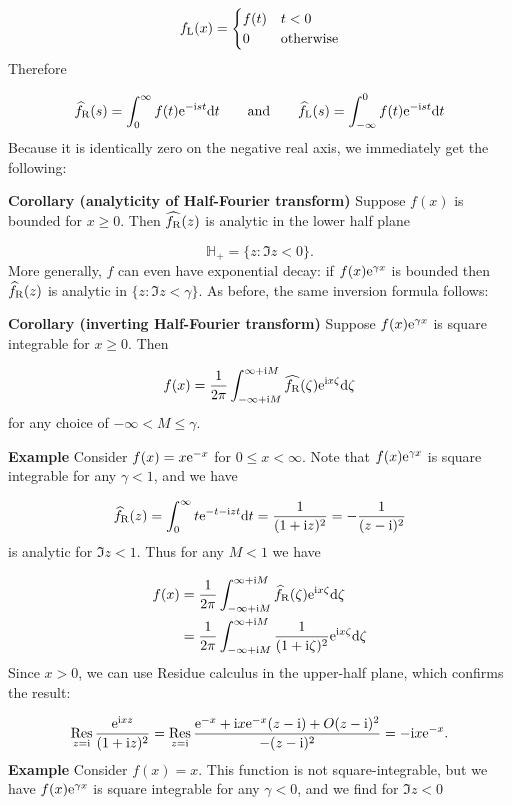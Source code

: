 \documentclass[12pt,landscape]{article}
\def\qqand{\qquad\hbox{and}\qquad}
\def\D{ {\rm d} }
\def\I{ {\rm i} }
\def\E{ {\rm e} }
\def\H{ {\mathbb H} }
\def\fR{ f_{\rm R} }
\def\fL{ f_{\rm L} }
\def\Res_#1{\underset{#1}{\rm Res}\,}
\def\dt{\D t}
\begin{document}
{\[
f_{\rm L}(x) = \begin{cases}f(t) & t < 0 \\ 0 & \hbox{otherwise} \end{cases}
\]
Therefore

\[
\widehat\fR(s) = \int_0^\infty f(t) \E^{-\I s t} \dt \qqand \widehat\fL(s) = \int_{-\infty}^0 f(t) \E^{-\I s t} \dt
\]
Because it is identically zero on the negative real axis, we immediately get the following:

\textbf{Corollary (analyticity of Half-Fourier transform)}  Suppose $f(x)$ is bounded for $x \geq 0$. Then $\widehat{\fR}(z)$ is analytic in the lower half plane

\[
\H_+ = \{ z : \Im z < 0 \}.
\]
More generally, $f$ can even have exponential decay: if $f(x) \E^{\gamma x}$ is bounded then $\widehat\fR(z)$ is analytic in $\{z : \Im z < \gamma \}$.  As before, the same inversion formula follows:

\textbf{Corollary  (inverting Half-Fourier transform)}  Suppose  $f(x) \E^{\gamma x}$ is square integrable for $x \geq 0$. Then

\[
f(x) = {1 \over 2 \pi} \int_{-\infty + \I M}^{\infty + \I M} \widehat{\fR}(\zeta) \E^{\I x \zeta} \D \zeta
\]
for any choice of $-\infty < M \leq \gamma$.

\textbf{Example} Consider $f(x)  = x \E^{-x}$ for $0 \leq x < \infty$.  Note that $f(x) \E^{\gamma x}$ is square integrable for any $\gamma < 1$, and we have

\[
\widehat\fR(z) = \int_0^\infty t \E^{-t -\I z t} \dt = {1 \over (1+\I z)^2} = -{1 \over (z - \I)^2} 
\]
is analytic for $\Im z < 1$. Thus for any $M < 1$ we have


\begin{align*}
f(x) &= {1 \over 2 \pi} \int_{-\infty+\I M}^{\infty +\I M}\widehat\fR(\zeta) \E^{\I x \zeta}\D \zeta \\
     &={1 \over 2 \pi} \int_{-\infty+\I M}^{\infty +\I M}{1 \over (1+\I \zeta)^2} \E^{\I x \zeta}\D \zeta
\end{align*}
Since $x > 0$, we can use Residue calculus in the upper-half plane, which confirms the result:

\[
\Res_{z = \I} {\E^{\I x z} \over  (1+\I z)^2}  = \Res_{z = \I} {\E^{- x} + \I x \E^{-x} (z - \I) + O(z-\I)^2 \over  -(z-\I)^2}  = -\I x \E^{-x}.
\]
\textbf{Example} Consider $f(x) = x$.  This function is not square-integrable, but we have $f(x) \E^{\gamma x}$ is square integrable for any $\gamma < 0$, and we find for $\Im z < 0$

}
\end{document}
